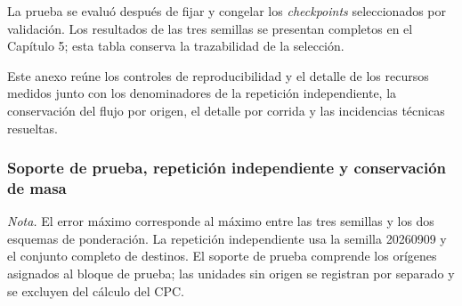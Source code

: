 La prueba se evaluó después de fijar y congelar los \textit{checkpoints} seleccionados por validación. Los resultados de las tres semillas se presentan completos en el Capítulo 5; esta tabla conserva la trazabilidad de la selección.

\clearpage
{}

Este anexo reúne los controles de reproducibilidad y el detalle de los recursos medidos junto con los denominadores de la repetición independiente, la conservación del flujo por origen, el detalle por corrida y las incidencias técnicas resueltas.

\subsubsection*{Soporte de prueba, repetición independiente y conservación de masa}

\begin{table}[H]
  \centering
  \scriptsize
  \caption{Controles de soporte, repetición independiente y conservación de masa.}
  \label{tab:anexo_controles_soporte}
\end{table}

\noindent\footnotesize\textit{Nota.} El error máximo corresponde al máximo entre las tres semillas y los dos esquemas de ponderación. La repetición independiente usa la semilla 20260909 y el conjunto completo de destinos. El soporte de prueba comprende los orígenes asignados al bloque de prueba; las unidades sin origen se registran por separado y se excluyen del cálculo del CPC.\normalsize

